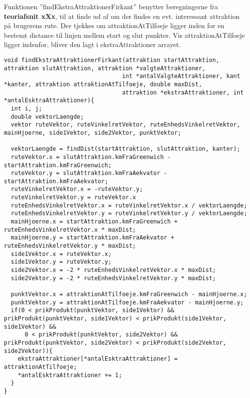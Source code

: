 Funktionen ”findEkstraAttraktionerFirkant” benytter beregningerne fra \textbf{teoriafsnit xXx}, til at finde ud af om der findes en evt. interessant attraktion på brugerens rute. Der tjekkes om attraktionAtTilfoeje ligger inden for en bestemt distance til linjen mellem start og slut punkter. Vis attraktionAtTilfoeje ligger indenfor, bliver den lagt i ekstraAttraktioner arrayet. 

\begin{lstlisting}
void findEkstraAttraktionerFirkant(attraktion startAttraktion, attraktion slutAttraktion, attraktion *valgteAttraktioner, 
                                  int *antalValgteAttraktioner, kant *kanter, attraktion attraktionAtTilfoeje, double maxDist, 
                                  attraktion *ekstraAttraktioner, int *antalEsktraAttraktioner){
  int i, j;
  double vektorLaengde;
  vektor ruteVektor, ruteVinkelretVektor, ruteEnhedsVinkelretVektor, mainHjoerne, side1Vektor, side2Vektor, punktVektor;

  vektorLaengde = findDist(startAttraktion, slutAttraktion, kanter);
  ruteVektor.x = slutAttraktion.kmFraGreenwich - startAttraktion.kmFraGreenwich;
  ruteVektor.y = slutAttraktion.kmFraAekvator - startAttraktion.kmFraAekvator;
  ruteVinkelretVektor.x = -ruteVektor.y;
  ruteVinkelretVektor.y = ruteVektor.x
  ruteEnhedsVinkelretVektor.x = ruteVinkelretVektor.x / vektorLaengde;
  ruteEnhedsVinkelretVektor.y = ruteVinkelretVektor.y / vektorLaengde;
  mainHjoerne.x = startAttraktion.kmFraGreenwich + ruteEnhedsVinkelretVektor.x * maxDist;
  mainHjoerne.y = startAttraktion.kmFraAekvator + ruteEnhedsVinkelretVektor.y * maxDist;
  side1Vektor.x = ruteVektor.x;
  side1Vektor.y = ruteVektor.y;
  side2Vektor.x = -2 * ruteEnhedsVinkelretVektor.x * maxDist; 
  side2Vektor.y = -2 * ruteEnhedsVinkelretVektor.y * maxDist;

  punktVektor.x = attraktionAtTilfoeje.kmFraGreenwich - mainHjoerne.x;
  punktVektor.y = attraktionAtTilfoeje.kmFraAekvator - mainHjoerne.y;
  if(0 < prikProdukt(punktVektor, side1Vektor) && prikProdukt(punktVektor, side1Vektor) < prikProdukt(side1Vektor, side1Vektor) &&
      0 < prikProdukt(punktVektor, side2Vektor) && prikProdukt(punktVektor, side2Vektor) < prikProdukt(side2Vektor, side2Vektor)){
    ekstraAttraktioner[*antalEsktraAttraktioner] = attraktionAtTilfoeje;
    *antalEsktraAttraktioner += 1;
  }
}
\end{lstlisting}



